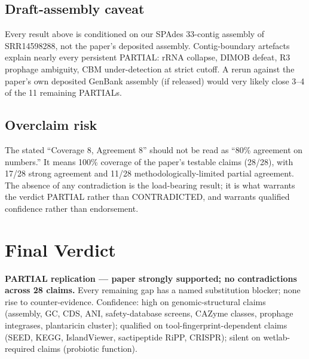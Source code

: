 \documentclass[11pt]{article}
\begin{document}
\subsection*{Draft-assembly caveat}
Every result above is conditioned on our SPAdes 33-contig assembly of SRR14598288, not the paper's deposited assembly. Contig-boundary artefacts explain nearly every persistent PARTIAL: rRNA collapse, DIMOB defeat, R3 prophage ambiguity, CBM under-detection at strict cutoff. A rerun against the paper's own deposited GenBank assembly (if released) would very likely close 3--4 of the 11 remaining PARTIALs.

\subsection*{Overclaim risk}
The stated ``Coverage 8, Agreement 8'' should not be read as ``80\% agreement on numbers.'' It means 100\% coverage of the paper's testable claims (28/28), with 17/28 strong agreement and 11/28 methodologically-limited partial agreement. The absence of any contradiction is the load-bearing result; it is what warrants the verdict PARTIAL rather than CONTRADICTED, and warrants qualified confidence rather than endorsement.

\section{Final Verdict}
\textbf{PARTIAL replication --- paper strongly supported; no contradictions across 28 claims.} Every remaining gap has a named substitution blocker; none rise to counter-evidence. Confidence: high on genomic-structural claims (assembly, GC, CDS, ANI, safety-database screens, CAZyme classes, prophage integrases, plantaricin cluster); qualified on tool-fingerprint-dependent claims (SEED, KEGG, IslandViewer, sactipeptide RiPP, CRISPR); silent on wetlab-required claims (probiotic function).
\end{document}
